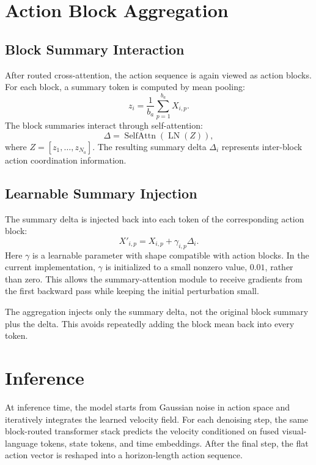 \documentclass[11pt]{article}
\begin{document}
\section{Action Block Aggregation}

\subsection{Block Summary Interaction}

After routed cross-attention, the action sequence is again viewed as action blocks. For each block, a summary token is computed by mean pooling:
\begin{equation}
    z_i = \frac{1}{b_a}\sum_{p=1}^{b_a} X_{i,p}.
\end{equation}
The block summaries interact through self-attention:
\begin{equation}
    \Delta = \operatorname{SelfAttn}(\operatorname{LN}(Z)),
\end{equation}
where $Z = [z_1,\ldots,z_{N_a}]$. The resulting summary delta $\Delta_i$ represents inter-block action coordination information.

\subsection{Learnable Summary Injection}

The summary delta is injected back into each token of the corresponding action block:
\begin{equation}
    X'_{i,p} = X_{i,p} + \gamma_{i,p}\Delta_i.
\end{equation}
Here $\gamma$ is a learnable parameter with shape compatible with action blocks. In the current implementation, $\gamma$ is initialized to a small nonzero value, $0.01$, rather than zero. This allows the summary-attention module to receive gradients from the first backward pass while keeping the initial perturbation small.

The aggregation injects only the summary delta, not the original block summary plus the delta. This avoids repeatedly adding the block mean back into every token.

\section{Inference}

At inference time, the model starts from Gaussian noise in action space and iteratively integrates the learned velocity field. For each denoising step, the same block-routed transformer stack predicts the velocity conditioned on fused visual-language tokens, state tokens, and time embeddings. After the final step, the flat action vector is reshaped into a horizon-length action sequence.
\end{document}
